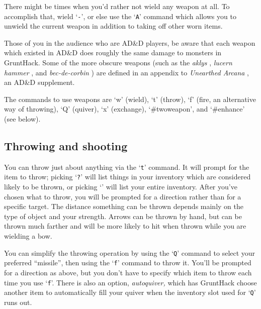 There might be times when you'd rather not wield any weapon at all.
To accomplish that, wield `{\tt -}', or else use the `{\tt A}' command which
allows you to unwield the current weapon in addition to taking off
other worn items.

Those of you in the audience who are AD\&D players, be aware that each
weapon which existed in AD\&D does roughly the same damage to monsters in
GruntHack.  Some of the more obscure weapons (such as the %
{\it  aklys}%
,
%
{\it  lucern hammer}%
, and %
{\it  bec-de-corbin}%
) are defined in an
appendix to %
{\it  Unearthed Arcana}%
, an AD\&D supplement.

The commands to use weapons are `w' (wield), `t' (throw),
`f' (fire, an alternative way of throwing), `Q' (quiver),
`x' (exchange), `\#twoweapon', and `\#enhance' (see below).
\subsection*{Throwing and shooting}

You can throw just about anything via the `{\tt t}' command.  It will prompt
for the item to throw; picking `{\tt ?}' will list things in your inventory
which are considered likely to be thrown, or picking `{\tt *}' will list
your entire inventory.  After you've chosen what to throw, you will
be prompted for a direction rather than for a specific target.  The
distance something can be thrown depends mainly on the type of object
and your strength.  Arrows can be thrown by hand, but can be thrown
much farther and will be more likely to hit when thrown while you are
wielding a bow.

You can simplify the throwing operation by using the `{\tt Q}' command to
select your preferred ``missile'', then using the `{\tt f}' command to
throw it.  You'll be prompted for a direction as above, but you don't
have to specify which item to throw each time you use `{\tt f}'.  There is
also an option,
{\it autoquiver, }
which has GruntHack choose another item to automatically fill your
quiver when the inventory slot used for `{\tt Q}' runs out.

